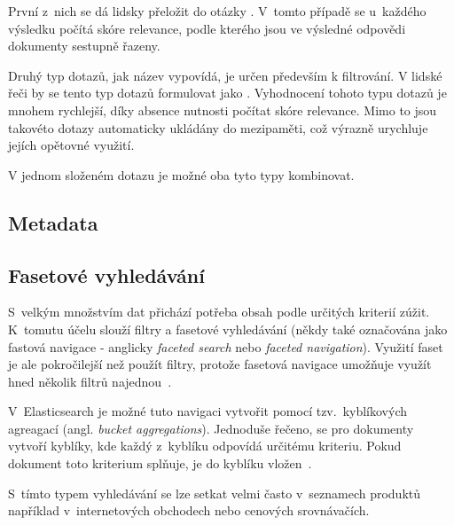 První z~nich se dá lidsky přeložit do otázky . V~tomto případě se u~každého výsledku počítá skóre relevance, podle kterého jsou ve výsledné odpovědi dokumenty sestupně řazeny.

Druhý typ dotazů, jak název vypovídá, je určen především k filtrování. V lidské řeči by se tento typ dotazů formulovat jako . Vyhodnocení tohoto typu dotazů je mnohem rychlejší, díky absence nutnosti počítat skóre relevance. Mimo to jsou takovéto dotazy automaticky ukládány do mezipaměti, což výrazně urychluje jejích opětovné využití. 

V jednom složeném dotazu je možné oba tyto typy kombinovat.

\subsection{Metadata}
\blindtext

\subsection{Fasetové vyhledávání}
S~velkým množstvím dat přichází potřeba obsah podle určitých kriterií zúžit. K~tomutu účelu slouží filtry a fasetové vyhledávání (někdy také označována jako fastová navigace - anglicky \emph{faceted search} nebo \emph{faceted navigation}). Využití faset je ale pokročilejší než použít filtry, protože fasetová navigace umožňuje využít hned několik filtrů najednou~\cite{bib:facet}.

V~Elasticsearch je možné tuto navigaci vytvořit pomocí tzv.~kyblíkových agreagací (angl. \emph{bucket aggregations}).
Jednoduše řečeno, se pro dokumenty vytvoří kyblíky, kde každý z~kyblíku odpovídá určitému kriteriu. Pokud dokument toto kriterium splňuje, je do kyblíku vložen~\cite{bib:elastic-bucket}.

S~tímto typem vyhledávání se lze setkat velmi často v~seznamech produktů například v~internetových obchodech nebo cenových srovnávačích.

